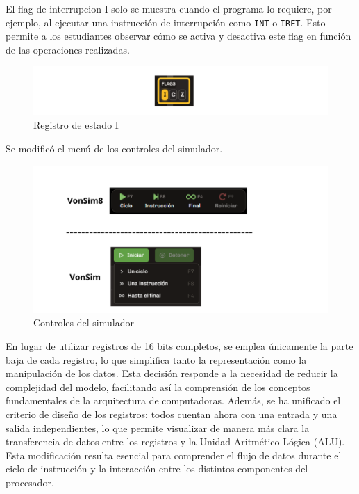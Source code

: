 \documentclass[12pt,oneside]{templates/unerthesis}
\begin{document}
El flag de interrupcion I solo se muestra cuando el programa lo requiere, por ejemplo, al ejecutar una instrucción de interrupción como \texttt{INT} o \texttt{IRET}. Esto permite a los estudiantes observar cómo se activa y desactiva este flag en función de las operaciones realizadas.

\begin{figure}

{\centering \includegraphics[width=1\linewidth]{images/flagi} 

}

\caption{Registro de estado I}\label{fig:banderaI}
\end{figure}

Se modificó el menú de los controles del simulador.

\begin{figure}

{\centering \includegraphics[width=1\linewidth]{images/controles} 

}

\caption{Controles del simulador}\label{fig:controles}
\end{figure}

En lugar de utilizar registros de 16 bits completos, se emplea únicamente la parte baja de cada registro, lo que simplifica tanto la representación como la manipulación de los datos. Esta decisión responde a la necesidad de reducir la complejidad del modelo, facilitando así la comprensión de los conceptos fundamentales de la arquitectura de computadoras. Además, se ha unificado el criterio de diseño de los registros: todos cuentan ahora con una entrada y una salida independientes, lo que permite visualizar de manera más clara la transferencia de datos entre los registros y la Unidad Aritmético-Lógica (ALU). Esta modificación resulta esencial para comprender el flujo de datos durante el ciclo de instrucción y la interacción entre los distintos componentes del procesador.
\end{document}
